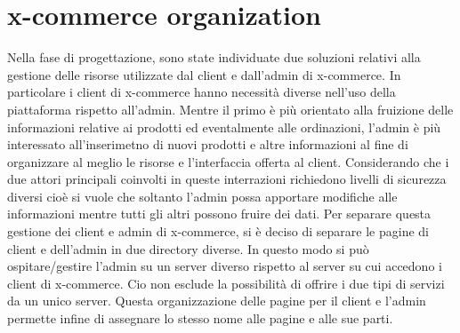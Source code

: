 \section{x-commerce organization}
\label{sec:x_commerce_organization}
Nella fase di progettazione, sono state individuate due soluzioni relativi alla gestione delle risorse utilizzate dal client e dall’admin di x-commerce. In particolare i client di x-commerce hanno necessità diverse nell'uso della piattaforma rispetto all'admin. Mentre il primo è più orientato alla fruizione delle informazioni relative ai prodotti ed eventalmente alle ordinazioni, l’admin è più interessato all'inserimetno di nuovi prodotti e altre informazioni al fine di organizzare al meglio le risorse e l'interfaccia offerta al client. Considerando che i due attori principali coinvolti in queste interrazioni richiedono livelli di sicurezza diversi cioè si vuole che soltanto l’admin possa apportare modifiche alle informazioni mentre tutti gli altri possono fruire dei dati.
\newline
Per separare questa gestione dei client e admin di x-commerce, si è deciso di separare le pagine di client e dell'admin in due directory diverse. In questo modo si può ospitare/gestire l'admin su un server diverso rispetto al server su cui accedono i client di x-commerce. Cio non esclude la possibilità di offrire i due tipi di servizi da un unico server.
\newline
Questa organizzazione delle pagine per il client e l’admin permette infine di assegnare lo stesso nome alle pagine e alle sue parti.